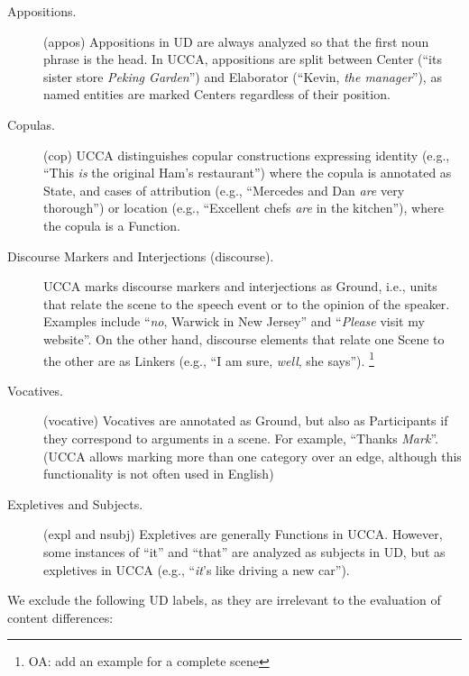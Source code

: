 \documentclass[11pt,a4paper]{article}
\newcommand{\oa}[1]{\footnote{\color{red}OA: #1}}
\begin{document}
\begin{description}

    \item[Appositions.] (appos)
    Appositions in UD are always analyzed so that the first
    noun phrase is the head. 
    In UCCA, appositions are split between Center
    (``its sister store \textit{Peking Garden}'')
    and Elaborator (``Kevin, \textit{the manager}''),
    as named entities are marked Centers regardless of their position.

    \item[Copulas.] (cop)
    UCCA distinguishes copular constructions expressing
    identity (e.g., ``This \textit{is} the original Ham's restaurant'') where the copula is annotated as State,
    and cases of attribution 
    (e.g., ``Mercedes and Dan \textit{are} very thorough'')
    or location (e.g., ``Excellent chefs \textit{are} in the kitchen''),
    where the copula is a Function.
    

    \item[Discourse Markers and Interjections (discourse).] 
    UCCA marks discourse markers and interjections as Ground, i.e., units that relate the scene 
    to the speech event or to the opinion of the speaker. Examples include ``\textit{no}, Warwick in New Jersey'' and ``\textit{Please} visit my website''.
    On the other hand, discourse elements that relate one Scene to the other 
    are as Linkers (e.g., ``I am sure, \textit{well}, she says'').
    \oa{add an example for a complete scene}

    \item[Vocatives.] (vocative)
    Vocatives are annotated as Ground, but also as Participants if they correspond to arguments in a scene.
    For example, ``Thanks \textit{Mark}''. (UCCA allows marking more than one category over an edge, although this
    functionality is not often used in English)
    
    \item[Expletives and Subjects.] (expl and nsubj)
    Expletives are generally Functions in UCCA.
    However, some instances of ``it'' and ``that'' are analyzed as subjects in UD,
    but as expletives in UCCA (e.g., ``\textit{it}'s like driving a new car'').    


\end{description}

We exclude the following UD labels,
as they are irrelevant to the evaluation of content differences:
\end{document}
